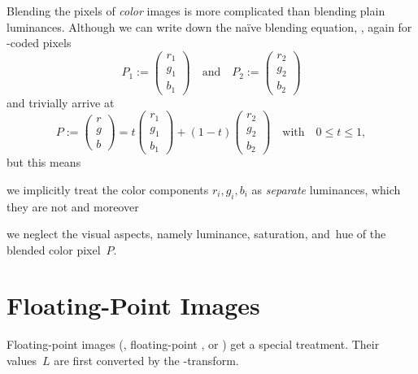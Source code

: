 Blending the pixels of \emph{color} images is more complicated than blending plain luminances.
Although we can write down the na\"ive blending equation, ,
again for -coded pixels
\[
  P_1 := \left(\begin{array}{c}r_1\\ g_1\\ b_1\end{array}\right)
  \quad \mbox{and}\quad
  P_2 := \left(\begin{array}{c}r_2\\ g_2\\ b_2\end{array}\right)
\]
and trivially arrive at
\begin{equation}\label{equ:trivial-rgb-blend}
  P :=
  \left(\begin{array}{c}r\\ g\\ b\end{array}\right) =
    t \left(\begin{array}{c}r_1\\ g_1\\ b_1\end{array}\right) +
    (1 - t) \left(\begin{array}{c}r_2\\ g_2\\ b_2\end{array}\right)
    \quad \mbox{with} \quad 0 \leq t \leq 1,
\end{equation}
but this means

\begin{compactitemize}
\item
  we implicitly treat the color components $r_i, g_i, b_i$ as \emph{separate} luminances, which
  they are not and moreover

\item
  we neglect the visual aspects, namely luminance, saturation, and~hue of the blended color
  pixel~$P$.
\end{compactitemize}


\section[Floating-Point Images]{\label{sec:floating-point-images}%
  Floating-Point Images}

%
%
%
%
%
%
%
%
%
%
Floating-point images (, floating-point , or ) get a
special treatment.  Their values~$L$ are first converted by the \LogTransform-transform.

